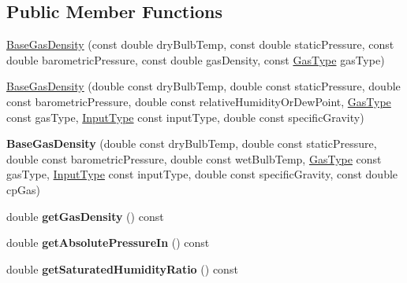 \subsection*{Public Member Functions}
\begin{DoxyCompactItemize}
\item 
\hyperlink{class_base_gas_density_a84089ddd9d29649d83a7b150b711b989}{Base\+Gas\+Density} (const double dry\+Bulb\+Temp, const double static\+Pressure, const double barometric\+Pressure, const double gas\+Density, const \hyperlink{class_base_gas_density_afb215e48f6193462521b7e8d47306ed3}{Gas\+Type} gas\+Type)
\item 
\hyperlink{class_base_gas_density_a0d53c40eecc4aad87c8fef1cfed1b614}{Base\+Gas\+Density} (double const dry\+Bulb\+Temp, double const static\+Pressure, double const barometric\+Pressure, double const relative\+Humidity\+Or\+Dew\+Point, \hyperlink{class_base_gas_density_afb215e48f6193462521b7e8d47306ed3}{Gas\+Type} const gas\+Type, \hyperlink{class_base_gas_density_a54f846cc4683a49d3904a40fe2986772}{Input\+Type} const input\+Type, double const specific\+Gravity)
\item 
\mbox{\label{class_base_gas_density_a08fc6e441bfec806ea73a9e37be60d92}} 
{\bfseries Base\+Gas\+Density} (double const dry\+Bulb\+Temp, double const static\+Pressure, double const barometric\+Pressure, double const wet\+Bulb\+Temp, \hyperlink{class_base_gas_density_afb215e48f6193462521b7e8d47306ed3}{Gas\+Type} const gas\+Type, \hyperlink{class_base_gas_density_a54f846cc4683a49d3904a40fe2986772}{Input\+Type} const input\+Type, double const specific\+Gravity, const double cp\+Gas)
\item 
\mbox{\label{class_base_gas_density_a1cbf2591aecb384afd5843f0e4a62a4e}} 
double {\bfseries get\+Gas\+Density} () const
\item 
\mbox{\label{class_base_gas_density_a7e99fc6b2f9ecf0399f05fb758499f88}} 
double {\bfseries get\+Absolute\+Pressure\+In} () const
\item 
\mbox{\label{class_base_gas_density_a11a91417432593ac1020265dc4836ee3}} 
double {\bfseries get\+Saturated\+Humidity\+Ratio} () const
\item 
\mbox{\label{class_base_gas_density_aa6ea4360eda19076a8d074a4ab798278}} 

\end{DoxyCompactItemize}
